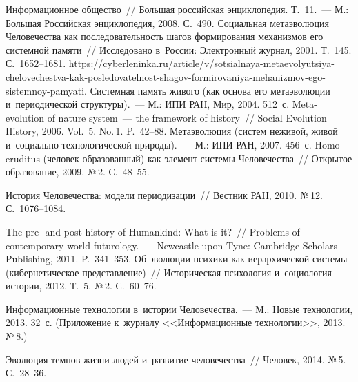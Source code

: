 \begin{multicols}{2}
{\small\frenchspacing
 {%
 \begin{thebibliography}{99}
 Информационное общество~// Большая российская 
энциклопедия. Т.~11.~--- М.: Большая Российская энциклопедия, 2008. С.~490.
 Социальная метаэволюция Человечества как последовательность 
шагов формирования механизмов его системной памяти~// Исследовано в~России: 
Электронный журнал, 2001. Т.~145. С.~1652--1681. {\sf  
https://cyberleninka.ru/article/v/sotsialnaya-metaevolyutsiya-chelovechestva-kak-posledovatelnost-shagov-formirovaniya-mehanizmov-ego-sistemnoy-pamyati}.
 Системная память живого (как основа его метаэволюции
и~периодической структуры).~--- М.: ИПИ РАН, Мир, 2004. 512~с.
 Meta-evolution of nature system~--- the framework of history~// Social 
Evolution History, 2006. Vol.~5. No.\,1. P.~42--88.
 Метаэволюция (сис\-тем неживой, живой  
и~со\-ци\-аль\-но-тех\-но\-ло\-ги\-че\-ской природы).~--- М.: ИПИ РАН, 2007. 456~с.
 Homo eruditus (человек образованный) как элемент сис\-те\-мы 
Человечества~// Открытое образование, 2009. №\,2. С.~48--55.

 История Человечества: модели периодизации~// 
Вестник РАН, 2010. №\,12. С.~1076--1084.

 The pre- and post-history of Humankind: What is it?~// Problems of 
contemporary world futurology.~--- Newcastle-upon-Tyne: Cambridge Scholars Publishing, 
2011. P.~341--353.
 Об эволюции психики как иерархической сис\-те\-мы 
(кибернетическое пред\-став\-ле\-ние)~// Историческая психология и~социология истории, 
2012. Т.~5. №\,2. С.~60--76.

 Информационные технологии в~истории 
Человечества.~--- М.: Новые технологии, 2013. 32~с. (Приложение к~журналу 
<<Информационные технологии>>, 2013. №\,8.)

 Эволюция темпов жизни людей и~развитие человечества~// Человек, 
2014. №\,5. С.~28--36.




\end{thebibliography}}}
\end{multicols}
